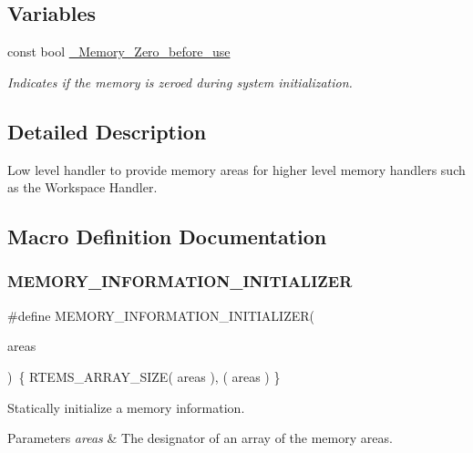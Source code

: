\subsection*{Variables}
\begin{DoxyCompactItemize}
\item 
const bool \mbox{\hyperlink{group__RTEMSScoreMemory_ga58fab34afaf489296d7ada0a582d766a}{\+\_\+\+Memory\+\_\+\+Zero\+\_\+before\+\_\+use}}
\begin{DoxyCompactList}\small\item\em Indicates if the memory is zeroed during system initialization. \end{DoxyCompactList}\end{DoxyCompactItemize}


\subsection{Detailed Description}
Low level handler to provide memory areas for higher level memory handlers such as the Workspace Handler. 



\subsection{Macro Definition Documentation}
\mbox{\label{group__RTEMSScoreMemory_gad5ba07c8e4e2f284f226c106cf28b8eb}} 
\subsubsection{\texorpdfstring{MEMORY\_INFORMATION\_INITIALIZER}{MEMORY\_INFORMATION\_INITIALIZER}}
{\footnotesize\ttfamily \#define M\+E\+M\+O\+R\+Y\+\_\+\+I\+N\+F\+O\+R\+M\+A\+T\+I\+O\+N\+\_\+\+I\+N\+I\+T\+I\+A\+L\+I\+Z\+ER(\begin{DoxyParamCaption}\item[{}]{areas }\end{DoxyParamCaption})~\{ R\+T\+E\+M\+S\+\_\+\+A\+R\+R\+A\+Y\+\_\+\+S\+I\+ZE( areas ), ( areas ) \}}



Statically initialize a memory information. 


\begin{DoxyParams}{Parameters}
{\em areas} & The designator of an array of the memory areas. \\
\hline
\end{DoxyParams}
\mbox{\label{group__RTEMSScoreMemory_ga8f4d5c0a6320c86845b6162782305b25}} 
